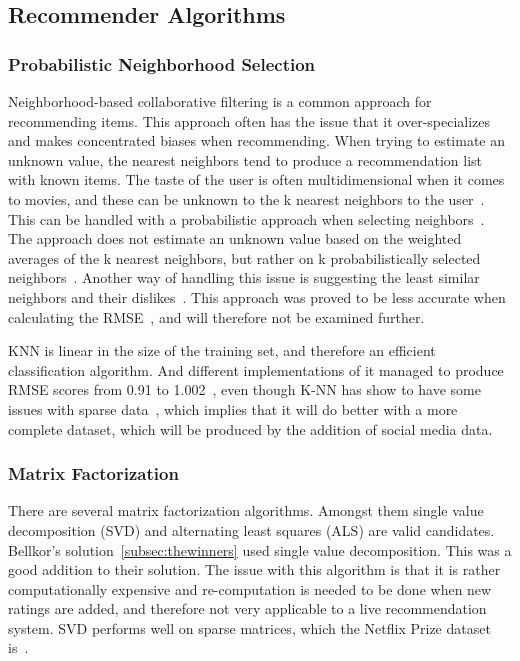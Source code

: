\subsection{Recommender Algorithms}
\subsubsection{Probabilistic Neighborhood Selection}
Neighborhood-based collaborative filtering is a common approach for recommending items. This approach often has the issue that it over-specializes and makes concentrated biases when recommending. When trying to estimate an unknown value, the nearest neighbors tend to produce a recommendation list with known items. The taste of the user is often multidimensional when it comes to movies, and these can be unknown to the k nearest neighbors to the user~\cite{umana}. This can be handled with a probabilistic approach when selecting neighbors~\cite{probcobfilter}. The approach does not estimate an unknown value based on the weighted averages of the k nearest neighbors, but rather on k probabilistically selected neighbors~\cite{optaplanner}. Another way of handling this issue is suggesting the least similar neighbors and their dislikes~\cite{furthestneighbor}. This approach was proved to be less accurate when calculating the RMSE~\cite{probcobfilter}, and will therefore not be examined further.

KNN is linear in the size of the training set, and therefore an efficient classification algorithm\cite{introtoIR}. And different implementations of it managed to produce RMSE scores from 0.91 to 1.002~\cite{knnnetflixstand, knnoldies, knnimpl, knncolbgroup}, even though K-NN has show to have some issues with sparse data~\cite{grobelnikDataSparsityIssues}, which implies that it will do better with a more complete dataset, which will be produced by the addition of social media data.


\subsubsection{Matrix Factorization}\label{subsubsec:matrixfac}
There are several matrix factorization algorithms. Amongst them single value decomposition (SVD) and alternating least squares (ALS) are valid candidates. Bellkor's solution~\ref{subsec:thewinners} used single value decomposition. This was a good addition to their solution. The issue with this algorithm is that it is rather computationally expensive and re-computation is needed to be done when new ratings are added, and therefore not very applicable to a live recommendation system. SVD performs well on sparse matrices, which the Netflix Prize dataset is~\cite{grobelnikDataSparsityIssues}.

